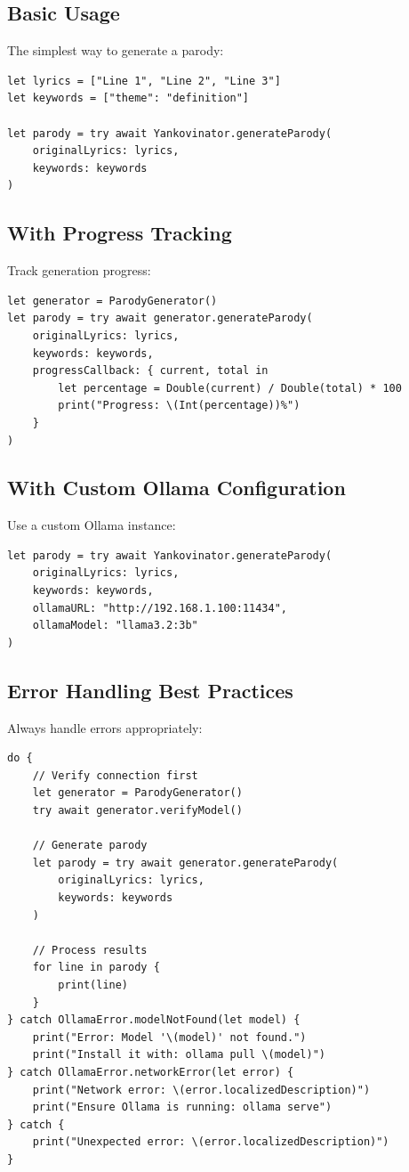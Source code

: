 \documentclass[11pt,a4paper]{article}
\begin{document}
\subsection{Basic Usage}

The simplest way to generate a parody:

\begin{lstlisting}
let lyrics = ["Line 1", "Line 2", "Line 3"]
let keywords = ["theme": "definition"]

let parody = try await Yankovinator.generateParody(
    originalLyrics: lyrics,
    keywords: keywords
)
\end{lstlisting}

\subsection{With Progress Tracking}

Track generation progress:

\begin{lstlisting}
let generator = ParodyGenerator()
let parody = try await generator.generateParody(
    originalLyrics: lyrics,
    keywords: keywords,
    progressCallback: { current, total in
        let percentage = Double(current) / Double(total) * 100
        print("Progress: \(Int(percentage))%")
    }
)
\end{lstlisting}

\subsection{With Custom Ollama Configuration}

Use a custom Ollama instance:

\begin{lstlisting}
let parody = try await Yankovinator.generateParody(
    originalLyrics: lyrics,
    keywords: keywords,
    ollamaURL: "http://192.168.1.100:11434",
    ollamaModel: "llama3.2:3b"
)
\end{lstlisting}

\subsection{Error Handling Best Practices}

Always handle errors appropriately:

\begin{lstlisting}
do {
    // Verify connection first
    let generator = ParodyGenerator()
    try await generator.verifyModel()
    
    // Generate parody
    let parody = try await generator.generateParody(
        originalLyrics: lyrics,
        keywords: keywords
    )
    
    // Process results
    for line in parody {
        print(line)
    }
} catch OllamaError.modelNotFound(let model) {
    print("Error: Model '\(model)' not found.")
    print("Install it with: ollama pull \(model)")
} catch OllamaError.networkError(let error) {
    print("Network error: \(error.localizedDescription)")
    print("Ensure Ollama is running: ollama serve")
} catch {
    print("Unexpected error: \(error.localizedDescription)")
}
\end{lstlisting}
\end{document}
